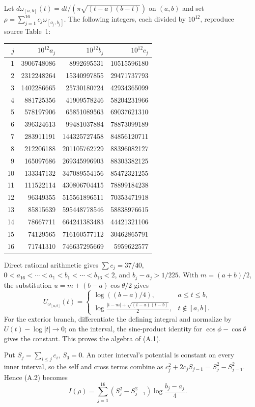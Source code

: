 Let $d\omega_{[a,b]}(t)=dt/(\pi\sqrt{(t-a)(b-t)})$ on $(a,b)$ and set
$\rho=\sum_{j=1}^{16}c_j\omega_{[a_j,b_j]}$.  The following integers,
each divided by $10^{12}$, reproduce source Table~1:
\begin{center}
\begin{tabular}{r|r|r|r}
$j$&$10^{12}a_j$&$10^{12}b_j$&$10^{12}c_j$\\\hline
1&3906748086&8992695531&10515596180\\
2&2312248264&15340997855&29471737793\\
3&1402286665&25730180724&42934365099\\
4&881725356&41909578246&58204231966\\
5&578197906&65851089563&69037621310\\
6&396324613&99481037884&78873099189\\
7&283911191&144325727458&84856120711\\
8&212206188&201105762729&88396082127\\
9&165097686&269345996903&88303382125\\
10&133347132&347089554156&85472321255\\
11&111522114&430806704415&78899184238\\
12&96349355&515561896511&70353471918\\
13&85815639&595448778546&58838976615\\
14&78667711&664241383483&44421321106\\
15&74129565&716160577112&30462865791\\
16&71741310&746637295669&5959622577
\end{tabular}
\end{center}
Direct rational arithmetic gives $\sum c_j=37/40$,
$0<a_{16}<\cdots<a_1<b_1<\cdots<b_{16}<2$, and
$b_j-a_j>1/225$.  With $m=(a+b)/2$, the substitution
$u=m+(b-a)\cos\theta/2$ gives
\begin{equation}
 U_{\omega_{[a,b]}}(t)=
 \begin{cases}
 \log((b-a)/4),&a\le t\le b,\\
 \displaystyle\log\frac{|t-m|+\sqrt{(t-a)(t-b)}}2,&t\notin[a,b].
 \end{cases}
 \label{appa-arcsine}
\end{equation}
For the exterior branch, differentiate the defining integral and
normalize by $U(t)-\log|t|\to0$; on the interval, the sine-product
identity for $\cos\phi-\cos\theta$ gives the constant.  This proves
the algebra of (A.1).

Put $S_j=\sum_{i\le j}c_i$, $S_0=0$.  An outer interval's potential
is constant on every inner interval, so the self and cross terms combine
as $c_j^2+2c_jS_{j-1}=S_j^2-S_{j-1}^2$.  Hence (A.2) becomes
\begin{equation}
 I(\rho)=\sum_{j=1}^{16}(S_j^2-S_{j-1}^2)
                          \log\frac{b_j-a_j}{4}.
 \label{appa-energy}
\end{equation}

